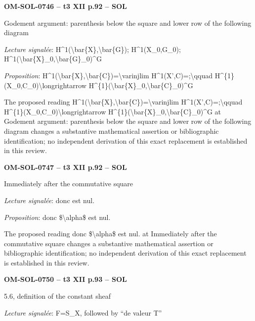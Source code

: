 \par\noindent\textbf{OM-SOL-0746 -- t3 XII p.92 -- SOL}\par
Godement argument: parenthesis below the square and lower row of the following diagram\par
\emph{Lecture signalée}: H\textasciicircum{}1(\textbackslash{}bar\{X\},\textbackslash{}bar\{G\}); H\textasciicircum{}1(X\_0,G\_0); H\textasciicircum{}1(\textbackslash{}bar\{X\}\_0,\textbackslash{}bar\{G\}\_0)\textasciicircum{}G\par
\emph{Proposition}: H\textasciicircum{}1(\textbackslash{}bar\{X\},\textbackslash{}bar\{C\})=\allowbreak \textbackslash{}varinjlim H\textasciicircum{}1(X',C)=;\textbackslash{}qquad H\textasciicircum{}\{1\}(X\_0,C\_0)\textbackslash{}longrightarrow H\textasciicircum{}\{1\}(\textbackslash{}bar\{X\}\_0,\textbackslash{}bar\{C\}\_0)\textasciicircum{}G\par
The proposed reading H\textasciicircum{}1(\textbackslash{}bar\{X\},\textbackslash{}bar\{C\})=\allowbreak \textbackslash{}varinjlim H\textasciicircum{}1(X',C)=;\textbackslash{}qquad H\textasciicircum{}\{1\}(X\_0,C\_0)\textbackslash{}longrightarrow H\textasciicircum{}\{1\}(\textbackslash{}bar\{X\}\_0,\textbackslash{}bar\{C\}\_0)\textasciicircum{}G at Godement argument: parenthesis below the square and lower row of the following diagram changes a substantive mathematical assertion or bibliographic identification; no independent derivation of this exact replacement is established in this review.\par
\par\noindent\textbf{OM-SOL-0747 -- t3 XII p.92 -- SOL}\par
Immediately after the commutative square\par
\emph{Lecture signalée}: donc est nul.\par
\emph{Proposition}: donc \$\textbackslash{}alpha\$ est nul.\par
The proposed reading donc \$\textbackslash{}alpha\$ est nul. at Immediately after the commutative square changes a substantive mathematical assertion or bibliographic identification; no independent derivation of this exact replacement is established in this review.\par
\par\noindent\textbf{OM-SOL-0750 -- t3 XII p.93 -- SOL}\par
5.6, definition of the constant sheaf\par
\emph{Lecture signalée}: F=\allowbreak S\_X, followed by “de valeur T”\par
